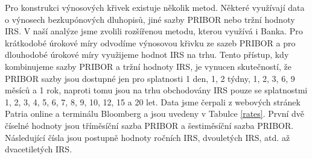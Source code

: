 \documentclass[a4paper,12pt]{report}
\theoremstyle{definition} \newtheorem{definice}[veta]{Definice}
\theoremstyle{remark}
\begin{document}
Pro konstrukci výnosových křivek existuje několik metod.
Některé využívají data o výnosech bezkupónových dluhopisů, jiné sazby PRIBOR nebo tržní hodnoty IRS.
V naší analýze jsme zvolili rozšířenou metodu, kterou využívá i Banka. 
Pro krátkodobé úrokové míry odvodíme výnosovou křivku ze sazeb PRIBOR a pro dlouhodobé úrokové míry využijeme hodnot IRS na trhu.
Tento přístup, kdy kombinujeme sazby PRIBOR a tržní hodnoty IRS, je vynucen skutečností, že PRIBOR sazby jsou dostupné jen pro splatnosti 1 den, 1, 2 týdny, 1, 2, 3, 6, 9 měsíců a 1 rok, 
naproti tomu jsou na trhu obchodovány IRS pouze se splatnostmi 1, 2, 3, 4, 5, 6, 7, 8, 9, 10, 12, 15 a 20 let.
Data jsme čerpali z webových stránek Patria online a terminálu Bloomberg a jsou uvedeny v Tabulce \ref{rates}.
První dvě číselné hodnoty jsou tříměsíční sazba PRIBOR a šestiměsíční sazba PRIBOR. 
Následující čísla jsou postupně hodnoty ročních IRS, dvouletých IRS, atd. až dvacetiletých IRS. 
\end{document}
